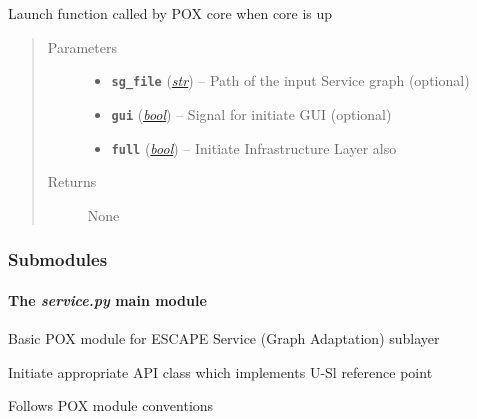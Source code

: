 \documentclass[letterpaper,10pt,english]{sphinxmanual}
\begin{document}
\begin{fulllineitems}
\label{unify:unify.launch}
Launch function called by POX core when core is up
\begin{quote}\begin{description}
\item[{Parameters}] \leavevmode\begin{itemize}
\item {} 
\textbf{\texttt{sg\_file}} (\href{https://docs.python.org/2.7/library/functions.html\#str}{\emph{str}}) -- Path of the input Service graph (optional)

\item {} 
\textbf{\texttt{gui}} (\href{https://docs.python.org/2.7/library/functions.html\#bool}{\emph{bool}}) -- Signal for initiate GUI (optional)

\item {} 
\textbf{\texttt{full}} (\href{https://docs.python.org/2.7/library/functions.html\#bool}{\emph{bool}}) -- Initiate Infrastructure Layer also

\end{itemize}

\item[{Returns}] \leavevmode
None

\end{description}\end{quote}

\end{fulllineitems}



\subsubsection{Submodules}
\label{unify:submodules}

\paragraph{The \emph{service.py} main module}
\label{service:module-service}\label{service:the-service-py-main-module}\label{service::doc}
Basic POX module for ESCAPE Service (Graph Adaptation) sublayer

Initiate appropriate API class which implements U-Sl reference point

Follows POX module conventions
\end{document}
